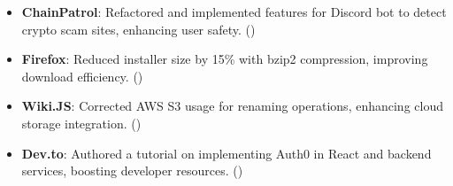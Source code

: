 %
%
%

\onecolumnsection
{
\vspace{1em}
\begin{itemize}
    \setlength\itemsep{0.2em}
	\item \textbf{ChainPatrol}: Refactored and implemented features for Discord bot to detect crypto scam sites, enhancing user safety. ()
	\item \textbf{Firefox}: Reduced installer size by 15\% with bzip2 compression, improving download efficiency. ()
	\item \textbf{Wiki.JS}: Corrected AWS S3 usage for renaming operations, enhancing cloud storage integration. ()
	\item \textbf{Dev.to}: Authored a tutorial on implementing Auth0 in React and backend services, boosting developer resources. ()
\end{itemize}}
